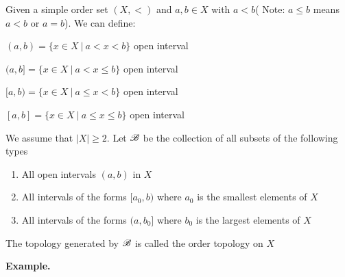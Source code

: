 Given a simple order set $(X,<)$ and $a,b \in X$ with $a<b$( Note: $a \leq b$ means $a < b$ or $a = b$). We can define:

$(a,b) = \{x \in X ~|~ a < x < b\}$ open interval

$(a,b] = \{x \in X ~|~ a < x \leq b\}$ open interval

$[a,b) = \{x \in X ~|~ a \leq x < b\}$ open interval

$[a,b] = \{x \in X ~|~ a \leq x \leq b\}$ open interval


We assume that $|X| \geq 2$. Let $\mathscr{B}$ be the collection of all subsets of the following types

\begin{enumerate}
	\item All open intervals $(a,b)$ in $X$
	\item All intervals of the forms $[a_0,b)$ where $a_0$ is the smallest elements of $X$
	\item All intervals of the forms $(a,b_0]$ where $b_0$ is the largest elements of $X$
\end{enumerate}

\begin{defn}
	The topology generated by $\mathscr{B}$ is called the order topology on $X$
\end{defn}

\textbf{Example.}

